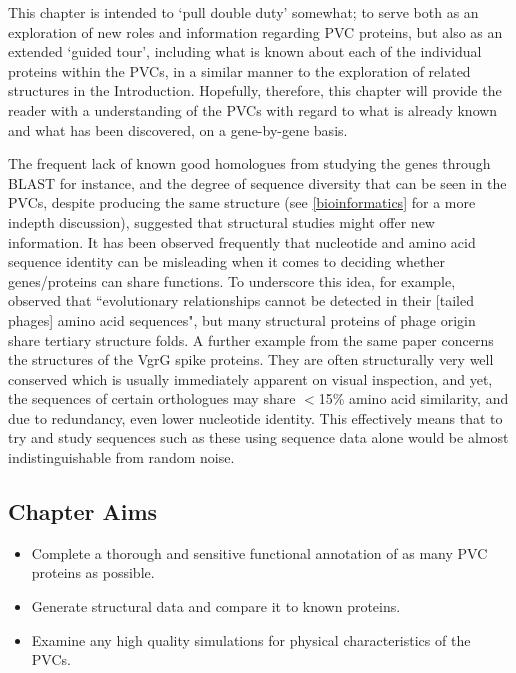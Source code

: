 This chapter is intended to `pull double duty' somewhat; to serve both as an exploration of new roles and information regarding PVC proteins, but also as an extended `guided tour', including what is known about each of the individual proteins within the PVCs, in a similar manner to the exploration of related structures in the Introduction. Hopefully, therefore, this chapter will provide the reader with a understanding of the PVCs with regard to what is already known and what has been discovered, on a gene-by-gene basis.

The frequent lack of known good homologues from studying the genes through BLAST for instance, and the degree of sequence diversity that can be seen in the PVCs, despite producing the same structure (see \vref{bioinformatics} for a more indepth discussion), suggested that structural studies might offer new information. It has been observed frequently that nucleotide and amino acid sequence identity can be misleading when it comes to deciding whether genes/proteins can share functions. To underscore this idea, \cite{Leiman2010} for example, observed that ``evolutionary relationships cannot be detected in their [tailed phages] amino acid sequences", but many structural proteins of phage origin share tertiary structure folds. A further example from the same paper concerns the structures of the VgrG spike proteins. They are often structurally very well conserved which is usually immediately apparent on visual inspection, and yet, the sequences of certain orthologues may share $<$15\% amino acid similarity, and due to redundancy, even lower nucleotide identity. This effectively means that to try and study sequences such as these using sequence data alone would be almost indistinguishable from random noise.


\subsection*{Chapter Aims}

\begin{itemize}
	\item Complete a thorough and sensitive functional annotation of as many PVC proteins as possible.
	\item Generate structural data and compare it to known proteins.
	\item Examine any high quality simulations for physical characteristics of the PVCs.

\end{itemize}


